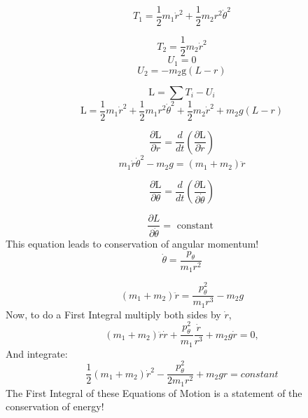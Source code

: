 \documentclass[12pt, letterpaper]{article}
\begin{document}
$$
T_{1}=\frac{1}{2} m_{1} \dot r^{2}+\frac{1}{2} m_2 r^{2} \dot{\theta}^{2}
$$

$$
T_{2}=\frac{1}{2} m_{2} \dot{r}^{2}
$$
$$
U_{1}=0
$$
$$
U_{2}=-m_2 \mathrm{g}(L-r)
$$

$$
\mathrm{L}=\sum T_{i}-{U_{i}}
$$
$$
\boxed{
\mathrm{L}=\frac{1}{2} m_1 \dot{r}^{2}+\frac{1}{2} m_1 r^{2} \dot{\theta}^{2}+\frac{1}{2} m_2 \dot{r}^{2}+m_{2} g(L-r)
}
$$

$$
\frac{\partial \mathrm{L}}{\partial r}=\frac{d}{d t}\left(\frac{\partial \mathrm{L}}{\partial \dot{r}}\right)
$$
$$
m_{1} \dot r \dot{\theta}^{2}-m_{2} g=\left(m_1+m_{2}\right) \ddot{r}
$$

$$
\frac{\partial \mathrm{L}}{\partial \theta}=\frac{d}{d t}\left(\frac{\partial \mathrm{L}}{\partial \dot{\theta}}\right)
$$

$$
\frac{\partial L}{\partial \dot{\theta}}=\text { constant }
$$
This equation leads to conservation of angular momentum!
$$
\dot{\theta}=\frac{p_{\theta}}{m_{1} r^{2}}
$$

$$
\boxed{
\left(m_{1}+m_{2}\right) \ddot{r}=\frac{p_{\theta}^{2}}{m_{1} r^{3}}-m_{2} g
}
$$
Now, to do a First Integral multiply both sides by $\dot r$,
$$
\left(m_{1}+m_{2}\right) \ddot{r} \dot{r}+\frac{p_{\theta}^{2}}{m_{1}} \frac{\dot{r}}{r^{3}}+m_{2} g \dot{r}=0,
$$
And integrate:
$$
\boxed{
\frac{1}{2}\left(m_{1}+m_{2}\right) \dot{r}^{2}-\frac{p_{\theta}^{2}}{2 m_{1} r^{2}}+m_{2} g r= constant}
$$
The First Integral of these Equations of Motion is a statement of the conservation of energy!
\end{document}
